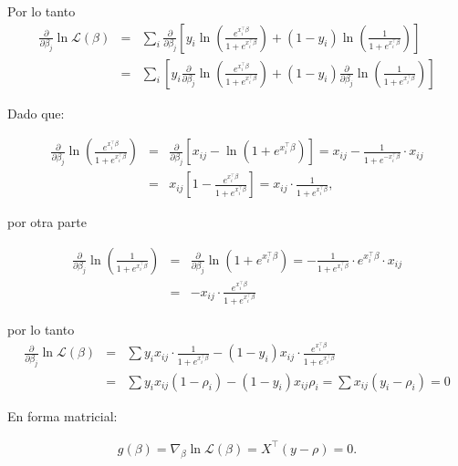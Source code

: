 \documentclass[12pt]{article}
\begin{document}
Por lo tanto
\begin{eqnarray*}
\frac{\partial}{\partial \beta_j} \ln \mathcal{L}(\beta)
&=& \sum_i \frac{\partial}{\partial \beta_j} \left[
y_i \ln \left( \frac{e^{x_i^\top \beta}}{1 + e^{x_i^\top \beta}} \right)
+ (1 - y_i) \ln \left( \frac{1}{1 + e^{x_i^\top \beta}} \right)
\right]\\
&=& \sum_i \left[
y_i \frac{\partial}{\partial \beta_j} \ln \left( \frac{e^{x_i^\top \beta}}{1 + e^{x_i^\top \beta}} \right)
+ (1 - y_i) \frac{\partial}{\partial \beta_j} \ln \left( \frac{1}{1 + e^{x_i^\top \beta}} \right)
\right]
\end{eqnarray*}

Dado que:

\begin{eqnarray*}
\frac{\partial}{\partial \beta_j} \ln \left( \frac{e^{x_i^\top \beta}}{1 + e^{x_i^\top \beta}} \right)
&=& \frac{\partial}{\partial \beta_j} \left[ x_{ij} - \ln \left( 1 + e^{x_i^\top \beta} \right) \right]
= x_{ij} - \frac{1}{1 + e^{-x_i^\top \beta}} \cdot x_{ij}\\
&=& x_{ij} \left[ 1 - \frac{e^{x_i^\top \beta}}{1 + e^{x_i^\top \beta}} \right]= x_{ij} \cdot \frac{1}{1 + e^{x_i^\top \beta}},
\end{eqnarray*}

por otra parte

\begin{eqnarray*}
\frac{\partial}{\partial \beta_j} \ln \left( \frac{1}{1 + e^{x_i^\top \beta}} \right) 
&=& \frac{\partial}{\partial \beta_j} \ln \left(1 + e^{x_i^\top \beta} \right)
= - \frac{1}{1 + e^{x_i^\top \beta}} \cdot e^{x_i^\top \beta} \cdot x_{ij}\\
&=& -x_{ij} \cdot \frac{e^{x_i^\top \beta}}{1 + e^{x_i^\top \beta}}
\end{eqnarray*}

por lo tanto
\begin{eqnarray*}
\frac{\partial}{\partial \beta_j} \ln \mathcal{L}(\beta) &=&
\sum y_i x_{ij} \cdot \frac{1}{1 + e^{x_i^\top \beta}} 
- (1 - y_i) x_{ij} \cdot \frac{e^{x_i^\top \beta}}{1 + e^{x_i^\top \beta}}\\
&=& \sum y_i x_{ij} (1 - \rho_i) - (1 - y_i) x_{ij} \rho_i
= \sum x_{ij} (y_i - \rho_i) = 0
\end{eqnarray*}

En forma matricial:

\begin{eqnarray}
g(\beta) = \nabla_\beta \ln \mathcal{L}(\beta) = X^\top (y - \rho) = 0.
\end{eqnarray}
\end{document}
